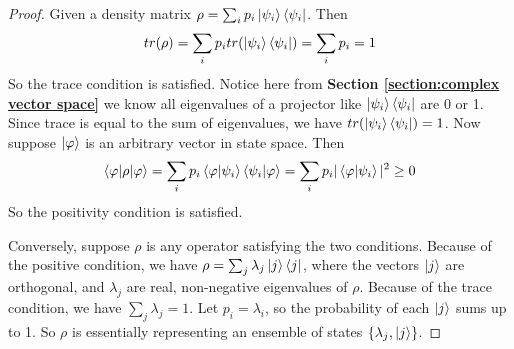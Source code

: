 \begin{proof}
Given a density matrix $\rho=\sum_i p_i \ket{\psi_i}\bra{\psi_i}$. Then
\begin{equation}
    tr(\rho)=\sum_i p_i tr(\ket{\psi_i}\bra{\psi_i})=\sum_i p_i =1
\end{equation}
So the trace condition is satisfied. Notice here from \textbf{Section \ref{section:complex vector space}} we know all eigenvalues of a projector like $\ket{\psi_i}\bra{\psi_i}$ are 0 or 1. Since trace is equal to the sum of eigenvalues, we have $tr(\ket{\psi_i}\bra{\psi_i})=1$. Now suppose $\ket{\varphi}$ is an arbitrary vector in state space. Then
\begin{equation}
    \braket{\varphi|\rho|\varphi}=\sum_i p_i \braket{\varphi|\psi_i} \braket{\psi_i|\varphi}=\sum_i p_i |\braket{\varphi|\psi_i}|^2 \ge 0
\end{equation}
So the positivity condition is satisfied.

Conversely, suppose $\rho$ is any operator satisfying the two conditions. Because of the positive condition, we have $\rho=\sum_j \lambda_j \ket{j}\bra{j}$, where the vectors $\ket{j}$ are orthogonal, and $\lambda_j$ are real, non-negative eigenvalues of $\rho$. Because of the trace condition, we have $\sum_j \lambda_j=1$. Let $p_i=\lambda_i$, so the probability of each $\ket{j}$ sums up to 1. So $\rho$ is essentially representing an ensemble of states $\{\lambda_j, \ket{j}\}$.
\end{proof}

\pagebreak

